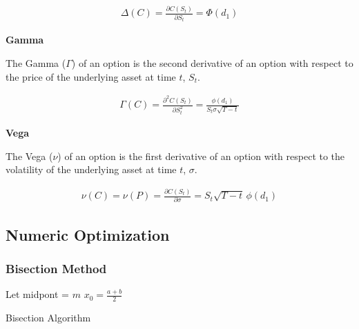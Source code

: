 \documentclass[10pt]{article}
\begin{document}
        \begin{gather*}
            \Delta(C) = \frac{\partial C(S_t)}{\partial S_t} = \Phi(d_1)
        \end{gather*}
    
        \textbf{Gamma}
    
        The Gamma ($\Gamma$) of an option is the second derivative of an option with respect to the price of the underlying asset at time $t$, $S_t$.
    
        \begin{gather*}
            \Gamma(C) = \frac{\partial^2 C(S_t)}{\partial S_t^2} = \frac{\phi(d_1)}{S_t \sigma \sqrt{T-t}}
        \end{gather*}
    
        \textbf{Vega}
    
        The Vega ($\nu$) of an option is the first derivative of an option with respect to the volatility of the underlying asset at time $t$, $\sigma$.
        
        \begin{gather*}
            \nu(C) = \nu(P) = \frac{\partial C(S_t)}{\partial \sigma} = S_t \sqrt{T-t} \, \phi(d_1)
        \end{gather*}
        
        

    \newpage
    \subsection{Numeric Optimization}

        \subsubsection{Bisection Method}

        \begin{algorithm}[t]
            \SetAlgoNoLine
            Let midpont = $m$\;
            $x_0 = \frac{a + b}{2}$\;
            \caption{Bisection Algorithm}
            \label{alg:bisection}
        \end{algorithm}
\end{document}
